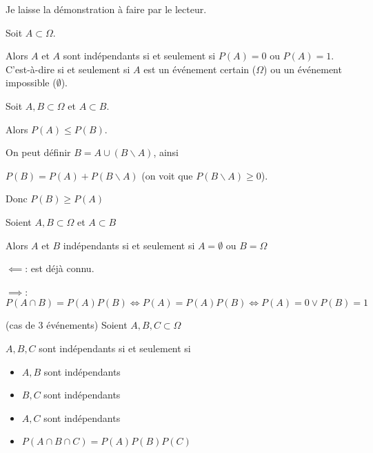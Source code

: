 \documentclass[a4paper, 12pt]{article}
\begin{document}
\begin{demonstration}
    Je laisse la démonstration à faire par le lecteur.
\end{demonstration}

\begin{proposition}
    Soit $A \subset \Omega$.

    Alors $A$ et $A$ sont indépendants si et seulement si $P(A) = 0$ ou $P(A) = 1$.
    C'est-à-dire si et seulement si $A$ est un événement certain ($\Omega$) ou un événement impossible ($\emptyset$).
\end{proposition}

\begin{proposition}
    Soit $A, B \subset \Omega$ et $A \subset B$.

    Alors $P(A) \leq P(B)$.
\end{proposition}

\begin{demonstration}
    On peut définir $B = A \cup (B\backslash A)$, ainsi

    $P(B) = P(A) + P(B\backslash A)$ (on voit que $P(B\backslash A) \geq 0$).

    Donc $P(B) \geq P(A)$
\end{demonstration}

\begin{proposition}
    Soient $A, B \subset \Omega$ et $A \subset B$

    Alors $A$ et $B$ indépendants si et seulement si $A = \emptyset$ ou $B = \Omega$
\end{proposition}

\begin{demonstration}
    $\impliedby$: est déjà connu.

    $\implies$: $P(A \cap B) = P(A)P(B) \iff P(A) = P(A)P(B) \iff P(A) = 0 \lor P(B) = 1$
\end{demonstration}

\begin{definition}(cas de 3 événements)
    Soient $A, B, C \subset \Omega$

    $A, B, C$ sont indépendants si et seulement si
    \begin{itemize}
        \item $A, B$ sont indépendants
        \item $B, C$ sont indépendants
        \item $A, C$ sont indépendants
        \item $P(A \cap B \cap C) = P(A)P(B)P(C)$
    \end{itemize}
\end{definition}
\end{document}
